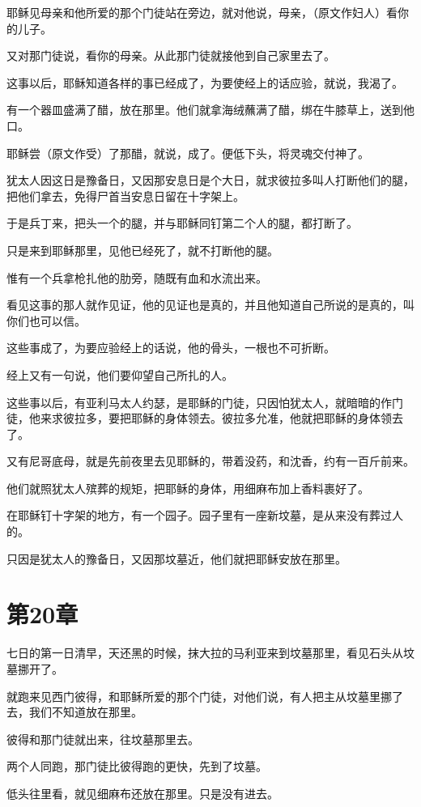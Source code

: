 \documentclass[12pt,oneside]{book}
\begin{document}
耶稣见母亲和他所爱的那个门徒站在旁边，就对他说，母亲，（原文作妇人）看你的儿子。

又对那门徒说，看你的母亲。从此那门徒就接他到自己家里去了。

这事以后，耶稣知道各样的事已经成了，为要使经上的话应验，就说，我渴了。

有一个器皿盛满了醋，放在那里。他们就拿海绒蘸满了醋，绑在牛膝草上，送到他口。

耶稣尝（原文作受）了那醋，就说，成了。便低下头，将灵魂交付神了。

犹太人因这日是豫备日，又因那安息日是个大日，就求彼拉多叫人打断他们的腿，把他们拿去，免得尸首当安息日留在十字架上。

于是兵丁来，把头一个的腿，并与耶稣同钉第二个人的腿，都打断了。

只是来到耶稣那里，见他已经死了，就不打断他的腿。

惟有一个兵拿枪扎他的肋旁，随既有血和水流出来。

看见这事的那人就作见证，他的见证也是真的，并且他知道自己所说的是真的，叫你们也可以信。

这些事成了，为要应验经上的话说，他的骨头，一根也不可折断。

经上又有一句说，他们要仰望自己所扎的人。

这些事以后，有亚利马太人约瑟，是耶稣的门徒，只因怕犹太人，就暗暗的作门徒，他来求彼拉多，要把耶稣的身体领去。彼拉多允准，他就把耶稣的身体领去了。

又有尼哥底母，就是先前夜里去见耶稣的，带着没药，和沈香，约有一百斤前来。

他们就照犹太人殡葬的规矩，把耶稣的身体，用细麻布加上香料裹好了。

在耶稣钉十字架的地方，有一个园子。园子里有一座新坟墓，是从来没有葬过人的。

只因是犹太人的豫备日，又因那坟墓近，他们就把耶稣安放在那里。

\chapter{第20章}
七日的第一日清早，天还黑的时候，抹大拉的马利亚来到坟墓那里，看见石头从坟墓挪开了。

就跑来见西门彼得，和耶稣所爱的那个门徒，对他们说，有人把主从坟墓里挪了去，我们不知道放在那里。

彼得和那门徒就出来，往坟墓那里去。

两个人同跑，那门徒比彼得跑的更快，先到了坟墓。

低头往里看，就见细麻布还放在那里。只是没有进去。
\end{document}
